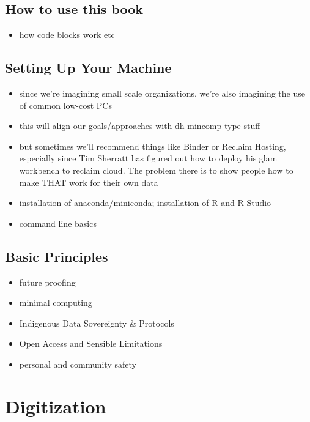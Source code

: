 \documentclass[
]{book}
\providecommand{\tightlist}{%
  \setlength{\itemsep}{0pt}\setlength{\parskip}{0pt}}
\begin{document}
\hypertarget{how-to-use}{%
\section{How to use this book}\label{how-to-use}}

\begin{itemize}
\tightlist
\item
  how code blocks work etc
\end{itemize}

\hypertarget{set-up}{%
\section{Setting Up Your Machine}\label{set-up}}

\begin{itemize}
\tightlist
\item
  since we're imagining small scale organizations, we're also imagining the use of common low-cost PCs
\item
  this will align our goals/approaches with dh mincomp type stuff
\item
  but sometimes we'll recommend things like Binder or Reclaim Hosting, especially since Tim Sherratt has figured out how to deploy his glam workbench to reclaim cloud. The problem there is to show people how to make THAT work for their own data
\item
  installation of anaconda/miniconda; installation of R and R Studio
\item
  command line basics
\end{itemize}

\hypertarget{basic-principles}{%
\section{Basic Principles}\label{basic-principles}}

\begin{itemize}
\tightlist
\item
  future proofing
\item
  minimal computing
\item
  Indigenous Data Sovereignty \& Protocols
\item
  Open Access and Sensible Limitations
\item
  personal and community safety
\end{itemize}

\hypertarget{digitization}{%
\chapter{Digitization}\label{digitization}}
\end{document}
